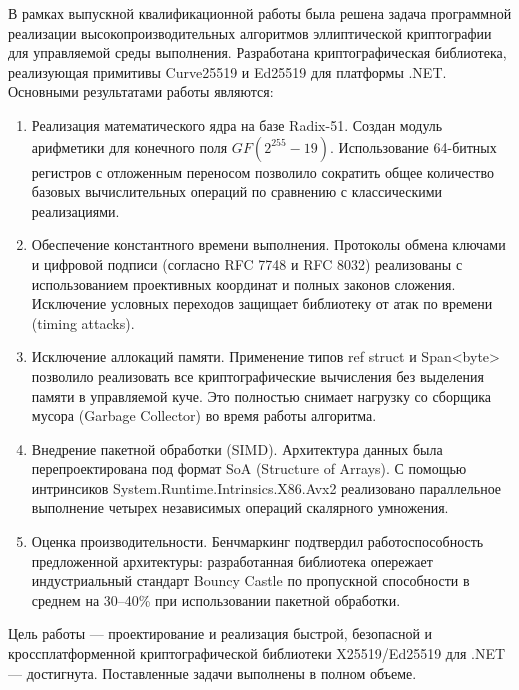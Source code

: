 В рамках выпускной квалификационной работы была решена задача программной реализации высокопроизводительных алгоритмов эллиптической криптографии для управляемой среды выполнения. Разработана криптографическая библиотека, реализующая примитивы Curve25519 и Ed25519 для платформы .NET. Основными результатами работы являются:

\begin{enumerate}
    \item Реализация математического ядра на базе Radix-51. Создан модуль арифметики для конечного поля $GF(2^{255}-19)$. Использование 64-битных регистров с отложенным переносом позволило сократить общее количество базовых вычислительных операций по сравнению с классическими реализациями.
    
    \item Обеспечение константного времени выполнения. Протоколы обмена ключами и цифровой подписи (согласно RFC 7748 и RFC 8032) реализованы с использованием проективных координат и полных законов сложения. Исключение условных переходов защищает библиотеку от атак по времени (timing attacks).
    
    \item Исключение аллокаций памяти. Применение типов ref struct и Span<byte> позволило реализовать все криптографические вычисления без выделения памяти в управляемой куче. Это полностью снимает нагрузку со сборщика мусора (Garbage Collector) во время работы алгоритма.
    
    \item Внедрение пакетной обработки (SIMD). Архитектура данных была перепроектирована под формат SoA (Structure of Arrays). С помощью интринсиков System.Runtime.Intrinsics.X86.Avx2 реализовано параллельное выполнение четырех независимых операций скалярного умножения.
    
    \item Оценка производительности. Бенчмаркинг подтвердил работоспособность предложенной архитектуры: разработанная библиотека опережает индустриальный стандарт Bouncy Castle по пропускной способности в среднем на 30–40\% при использовании пакетной обработки.
\end{enumerate}

Цель работы — проектирование и реализация быстрой, безопасной и кроссплатформенной криптографической библиотеки X25519/Ed25519 для .NET — достигнута. Поставленные задачи выполнены в полном объеме.


